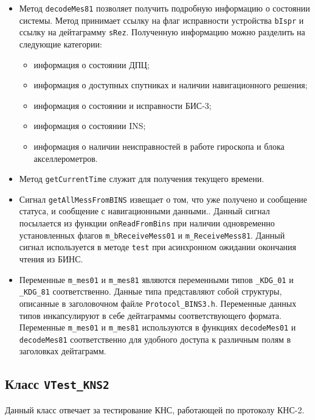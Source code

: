 \begin{itemize}
	\item Метод \texttt{decodeMes81} позволяет получить подробную информацию о состоянии системы. Метод принимает
		ссылку на флаг исправности устройства \texttt{bIspr} и ссылку на дейтаграмму \texttt{sRez}. Полученную
		информацию можно разделить на следующие категории:
		\begin{itemize}
				\item информация о состоянии ДПЦ;
				\item информация о доступных спутниках и наличии навигационного решения;
				\item информация о состоянии и исправности БИС-3;
				\item информация о состоянии INS;
				\item информация о наличии неисправностей в работе гироскопа и блока акселлерометров.
		\end{itemize}

	\item Метод \texttt{getCurrentTime} служит для получения текущего времени.

	\item Сигнал \texttt{getAllMessFromBINS} извещает о том, что уже получено и сообщение статуса, и сообщение с
		навигационными данными.. Данный сигнал посылается из функции \texttt{onReadFromBins} при наличии
		одновременно установленных флагов
		\texttt{m\_bReceiveMess01} и \texttt{m\_ReceiveMess81}. Данный сигнал используется в методе
		\texttt{test} при асинхронном ожидании окончания чтения из БИНС.

	\item Переменные \texttt{m\_mes01} и \texttt{m\_mes81} являются переменными типов \texttt{\_KDG\_01} и
		\texttt{\_KDG\_81} соответственно. Данные типа представляют собой структуры, описанные в заголовочном
		файле \texttt{Protocol\_BINS3.h}. Переменные данных типов инкапсулируют в себе дейтаграммы
		соответствующего формата. Переменные \texttt{m\_mes01} и \texttt{m\_mes81} используются в функциях
		\texttt{decodeMes01} и \texttt{decodeMes81} соответственно для удобного доступа к различным полям в
		заголовках дейтаграмм.
\end{itemize}

\subsection{Класс \texttt{VTest\_KNS2}}
Данный класс отвечает за тестирование КНС, работающей по протоколу КНС-2.

